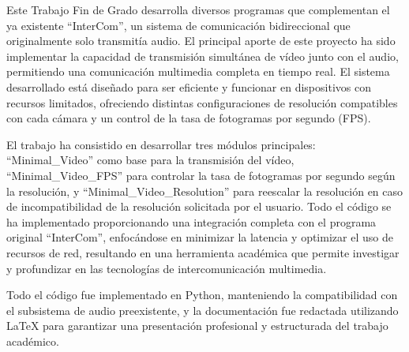 \selectfont
\setlength{\parindent}{1.5em} %
\setlength{\parskip}{1.2em} %
\large

\begin{justify}
{\color{white}\noindent\hspace{1.5em}Este Trabajo Fin de Grado desarrolla diversos programas que complementan el ya existente ``InterCom'', un sistema de comunicación bidireccional que originalmente solo transmitía audio. El principal aporte de este proyecto ha sido implementar la capacidad de transmisión simultánea de vídeo junto con el audio, permitiendo una comunicación multimedia completa en tiempo real. El sistema desarrollado está diseñado para ser eficiente y funcionar en dispositivos con recursos limitados, ofreciendo distintas configuraciones de resolución compatibles con cada cámara y un control de la tasa de fotogramas por segundo (FPS).}

{\color{white}\noindent\hspace{1.5em}El trabajo ha consistido en desarrollar tres módulos principales: ``Minimal\_Video'' como base para la transmisión del vídeo, ``Minimal\_Video\_FPS'' para controlar la tasa de fotogramas por segundo según la resolución, y ``Minimal\_Video\_Resolution'' para reescalar la resolución en caso de incompatibilidad de la resolución solicitada por el usuario. Todo el código se ha implementado proporcionando una integración completa con el programa original ``InterCom'', enfocándose en minimizar la latencia y optimizar el uso de recursos de red, resultando en una herramienta académica que permite investigar y profundizar en las tecnologías de intercomunicación multimedia.}

{\color{white}\noindent\hspace{1.5em}Todo el código fue implementado en Python, manteniendo la compatibilidad con el subsistema de audio preexistente, y la documentación fue redactada utilizando LaTeX para garantizar una presentación profesional y estructurada del trabajo académico.}
\end{justify}